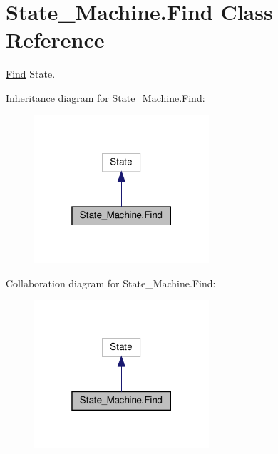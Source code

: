 \hypertarget{classState__Machine_1_1Find}{}\section{State\+\_\+\+Machine.\+Find Class Reference}
\label{classState__Machine_1_1Find}


\hyperlink{classState__Machine_1_1Find}{Find} State.  




Inheritance diagram for State\+\_\+\+Machine.\+Find\+:
\nopagebreak
\begin{figure}[H]
\begin{center}
\leavevmode
\includegraphics[width=184pt]{classState__Machine_1_1Find__inherit__graph}
\end{center}
\end{figure}


Collaboration diagram for State\+\_\+\+Machine.\+Find\+:
\nopagebreak
\begin{figure}[H]
\begin{center}
\leavevmode
\includegraphics[width=184pt]{classState__Machine_1_1Find__coll__graph}
\end{center}
\end{figure}
